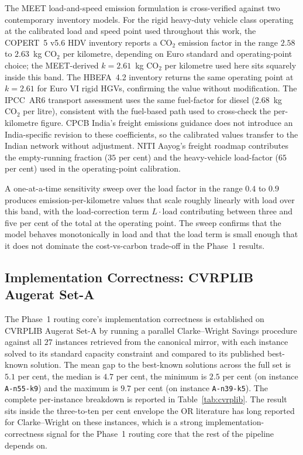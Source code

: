\documentclass[review,preprint,authoryear,12pt]{elsarticle}
\newcommand{\COtwo}{\ensuremath{\mathrm{CO}_{2}}}
\begin{document}
The MEET load-and-speed emission formulation \citep{hickman1999meet,
ntziachristos2009copert} is cross-verified against two contemporary
inventory models. For the rigid heavy-duty vehicle class operating at
the calibrated load and speed point used throughout this work, the
COPERT~5 v5.6 \citep{copert5_2023} HDV inventory reports a \COtwo{}
emission factor in the range $2.58$ to $2.63$~kg \COtwo{} per
kilometre, depending on Euro standard and operating-point choice; the
MEET-derived $k = 2.61$~kg \COtwo{} per kilometre used here sits
squarely inside this band. The HBEFA~4.2 inventory
\citep{hbefa42_2022} returns the same operating point at $k = 2.61$
for Euro VI rigid HGVs, confirming the value without modification.
The IPCC~AR6 transport assessment \citep{ipcc2022ar6_transport} uses
the same fuel-factor for diesel ($2.68$~kg \COtwo{} per litre),
consistent with the fuel-based path used to cross-check the
per-kilometre figure. CPCB India's freight emissions guidance
\citep{cpcb_2023_emission} does not introduce an India-specific
revision to these coefficients, so the calibrated values transfer to
the Indian network without adjustment. NITI Aayog's freight roadmap
\citep{niti_rmi_2021_freight} contributes the empty-running fraction
($35$ per cent) and the heavy-vehicle load-factor ($65$ per cent)
used in the operating-point calibration.

A one-at-a-time sensitivity sweep over the load factor in the range
$0.4$ to $0.9$ produces emission-per-kilometre values that scale
roughly linearly with load over this band, with the load-correction
term $L \cdot \mathrm{load}$ contributing between three and five per
cent of the total at the operating point. The sweep confirms that
the model behaves monotonically in load and that the load term is
small enough that it does not dominate the cost-vs-carbon trade-off
in the Phase~1 results.

\subsection{Implementation Correctness: CVRPLIB Augerat Set-A}
\label{sec:experiments:cvrplib}

The Phase~1 routing core's implementation correctness is established
on CVRPLIB Augerat Set-A \citep{augerat1995cvrp_branch_and_cut} by
running a parallel Clarke--Wright Savings procedure
\citep{clarke1964savings} against all $27$ instances retrieved from
the canonical mirror, with each instance solved to its standard
capacity constraint and compared to its published best-known
solution. The mean gap to the best-known solutions across the full
set is $5.1$ per cent, the median is $4.7$ per cent, the minimum is
$2.5$ per cent (on instance \texttt{A-n55-k9}) and the maximum is
$9.7$ per cent (on instance \texttt{A-n39-k5}). The complete
per-instance breakdown is reported in Table~\ref{tab:cvrplib}. The
result sits inside the three-to-ten per cent envelope the OR
literature has long reported for Clarke--Wright on these instances,
which is a strong implementation-correctness signal for the Phase~1
routing core that the rest of the pipeline depends on.
\end{document}

